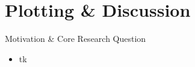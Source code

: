 \section{Plotting \& Discussion}

\begin{frame}{Motivation \& Core Research Question}
  \begin{itemize}
    \item tk
  \end{itemize}
\end{frame}